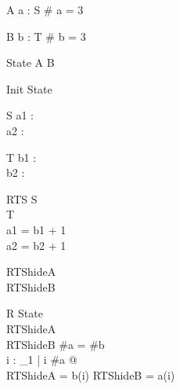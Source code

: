 \begin{schema}{A}
a : \seq S
\where
\# a = 3
\end{schema}

\begin{schema}{B}
b : \seq T
\where
\# b = 3
\end{schema}

\begin{zed}
State  A \land B
\end{zed}

\begin{schema}{Init}
State
\end{schema}

\begin{schema}{S}
a1 : \nat\\
a2 : \nat
\end{schema}

\begin{schema}{T}
b1 : \nat\\
b2 : \nat
\end{schema}

\begin{schema}{RTS}
S\\
T\\
\where
a1 = b1 + 1\\
a2 = b2 + 1
\end{schema}

\begin{zed}
RTShideA \\
RTShideB 
\end{zed}

%
%
\begin{schema}{R}
State\\
RTShideA\\
RTShideB
\where
\#a = \#b\\
\forall i : \nat_1 | i \leq \#a @ \\
      \theta RTShideA = b(i) \land \theta RTShideB = a(i)
\end{schema}
